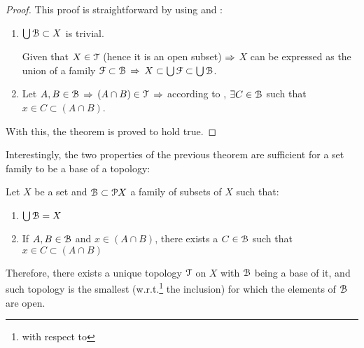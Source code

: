 \begin{proof}
	This proof is straightforward by using  and :
	\begin{enumerate}
		\item \noindent{$\boxed{\Rightarrow}$}  $\bigcup\EuScript{B} \subset X$ is trivial.

		\noindent{$\boxed{\Leftarrow}$} Given that $X\in \EuScript{T}$ (hence it is an open
		subset) $\Rightarrow$ $X$ can be expressed as the union of a family $\EuScript{F}\subset \EuScript{B}$
		$\Rightarrow$ $X \subset \bigcup \EuScript{F}\subset \bigcup \EuScript{B}$.

		\item Let $A, B\in \EuScript{B}$ $\Rightarrow$ $(A\cap B)\in \EuScript{T}$ $\Rightarrow$ according to
		, $\exists C\in \EuScript{B}$ such that $x\in C\subset(A\cap B)$.
	\end{enumerate}
	With this, the theorem is proved to hold true.
\end{proof}

Interestingly, the two properties of the previous theorem are sufficient for a set
family to be a base of a topology:

\begin{theorem}
	Let $X$ be a set and $\EuScript{B}\subset \EuScript{P} X$ a family of subsets of $X$ such that:
	\begin{enumerate}
		\item $\bigcup \EuScript{B} = X$
		\item If $A, B\in \EuScript{B}$ and $x\in (A\cap B)$, there exists a $C\in \EuScript{B}$ such that
		$x\in C\subset (A\cap B)$
	\end{enumerate}
	Therefore, there exists a unique topology $\EuScript{T}$ on $X$ with $\EuScript{B}$ being a base of it, 
	and such topology is the smallest (w.r.t.\footnote{with respect to} the inclusion) 
	for which the elements of $\EuScript{B}$ are open.
	\label{th:1-3}
\end{theorem}

